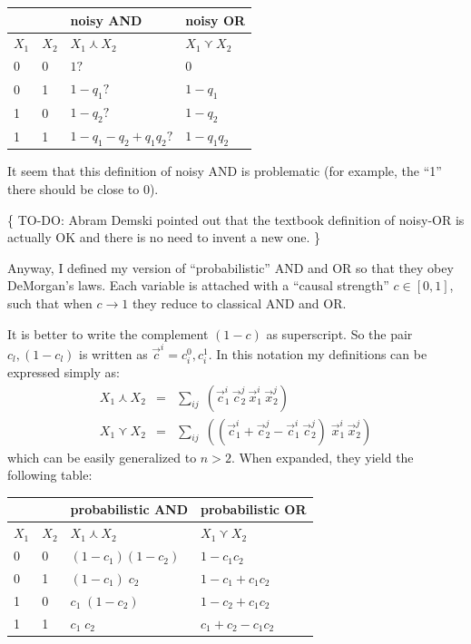 \hspace*{1cm} \begin{tabular}{|l|l||l||l|} \hline
\multicolumn{2}{|c||}{} & {\textbf{noisy AND}}           & {\textbf{noisy OR}}\\ \hline
$X_1$ & $X_2$           & $X_1 \curlywedge X_2$          & $ X_1 \curlyvee X_2 $\\ \hline
0     & 0               & $ 1 ? $                        & $ 0 $\\
0     & 1               & $ 1 - q_1 ? $                  & $ 1 - q_1 $\\
1     & 0               & $ 1 - q_2 ? $                  & $ 1 - q_2 $\\
1     & 1               & $ 1 - q_1 - q_2 + q_1 q_2 ? $  & $ 1 - q_1 q_2 $\\ \hline
\end{tabular}

It seem that this definition of noisy AND is problematic (for example, the ``1'' there should be close to 0).

\{ TO-DO:  Abram Demski pointed out that the textbook definition of noisy-OR is actually OK and there is no need to invent a new one. \}

Anyway, I defined my version of ``probabilistic'' AND and OR so that they obey DeMorgan's laws.  Each variable is attached with a ``causal strength'' $c \in [0,1]$, such that when $c \rightarrow 1$ they reduce to classical AND and OR.

It is better to write the complement $(1 - c)$ as superscript.  So the pair $c_l, (1 - c_l)$ is written as $\vec{c}^i = c_i^0, c_i^1$.  In this notation my definitions can be expressed simply as:
\begin{eqnarray}
 X_1 \curlywedge X_2 & = & \sum_{i j} \; ( \vec{c}^i_1 \, \vec{c}^j_2 \, \vec{x}^i_1 \, \vec{x}^j_2 ) \\
 X_1 \curlyvee   X_2 & = & \sum_{i j} \; ( ( \vec{c}^i_1 + \vec{c}^j_2 - \vec{c}^i_1 \, \vec{c}^j_2 ) \; \vec{x}^i_1 \, \vec{x}^j_2 )
\end{eqnarray}
which can be easily generalized to $n > 2$.  When expanded, they yield the following table:

\hspace*{1cm} \begin{tabular}{|l|l||l||l|}
\hline
\multicolumn{2}{|c||}{} & {\textbf{probabilistic AND}} & {\textbf{probabilistic OR}}\\
\hline
$X_1$ & $X_2$ & $X_1 \curlywedge X_2$          & $X_1 \curlyvee X_2$\\ \hline
0     & 0     & $(1-c_1) (1-c_2)$              & $1 - c_1 c_2$\\
0     & 1     & $(1-c_1) \; c_2$               & $1 - c_1 + c_1 c_2$\\
1     & 0     & $c_1 \; (1-c_2)$               & $1 - c_2 + c_1 c_2$\\
1     & 1     & $c_1 \; c_2$                   & $c_1 + c_2 - c_1 c_2$\\
\hline
\end{tabular}
\parbox{8cm}{\begin{equation}
\label{eqn:probabilistic-AND-OR}
\end{equation}}

